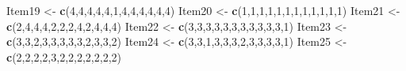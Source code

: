 \documentclass[
  english,
]{book}
\newenvironment{Shaded}{\begin{snugshade}}{\end{snugshade}}
\newcommand{\DecValTok}[1]{\textcolor[rgb]{0.00,0.00,0.81}{#1}}
\newcommand{\KeywordTok}[1]{\textcolor[rgb]{0.13,0.29,0.53}{\textbf{#1}}}
\newcommand{\NormalTok}[1]{#1}
\newcommand{\StringTok}[1]{\textcolor[rgb]{0.31,0.60,0.02}{#1}}
\begin{document}
\begin{Shaded}
\begin{Highlighting}[]
\NormalTok{Item19 <-}\StringTok{ }\KeywordTok{c}\NormalTok{(}\DecValTok{4}\NormalTok{,}\DecValTok{4}\NormalTok{,}\DecValTok{4}\NormalTok{,}\DecValTok{4}\NormalTok{,}\DecValTok{4}\NormalTok{,}\DecValTok{1}\NormalTok{,}\DecValTok{4}\NormalTok{,}\DecValTok{4}\NormalTok{,}\DecValTok{4}\NormalTok{,}\DecValTok{4}\NormalTok{,}\DecValTok{4}\NormalTok{,}\DecValTok{4}\NormalTok{)}
\NormalTok{Item20 <-}\StringTok{ }\KeywordTok{c}\NormalTok{(}\DecValTok{1}\NormalTok{,}\DecValTok{1}\NormalTok{,}\DecValTok{1}\NormalTok{,}\DecValTok{1}\NormalTok{,}\DecValTok{1}\NormalTok{,}\DecValTok{1}\NormalTok{,}\DecValTok{1}\NormalTok{,}\DecValTok{1}\NormalTok{,}\DecValTok{1}\NormalTok{,}\DecValTok{1}\NormalTok{,}\DecValTok{1}\NormalTok{,}\DecValTok{1}\NormalTok{)}
\NormalTok{Item21 <-}\StringTok{ }\KeywordTok{c}\NormalTok{(}\DecValTok{2}\NormalTok{,}\DecValTok{4}\NormalTok{,}\DecValTok{4}\NormalTok{,}\DecValTok{4}\NormalTok{,}\DecValTok{2}\NormalTok{,}\DecValTok{2}\NormalTok{,}\DecValTok{2}\NormalTok{,}\DecValTok{4}\NormalTok{,}\DecValTok{2}\NormalTok{,}\DecValTok{4}\NormalTok{,}\DecValTok{4}\NormalTok{,}\DecValTok{4}\NormalTok{)}
\NormalTok{Item22 <-}\StringTok{ }\KeywordTok{c}\NormalTok{(}\DecValTok{3}\NormalTok{,}\DecValTok{3}\NormalTok{,}\DecValTok{3}\NormalTok{,}\DecValTok{3}\NormalTok{,}\DecValTok{3}\NormalTok{,}\DecValTok{3}\NormalTok{,}\DecValTok{3}\NormalTok{,}\DecValTok{3}\NormalTok{,}\DecValTok{3}\NormalTok{,}\DecValTok{3}\NormalTok{,}\DecValTok{3}\NormalTok{,}\DecValTok{1}\NormalTok{)}
\NormalTok{Item23 <-}\StringTok{ }\KeywordTok{c}\NormalTok{(}\DecValTok{3}\NormalTok{,}\DecValTok{3}\NormalTok{,}\DecValTok{2}\NormalTok{,}\DecValTok{3}\NormalTok{,}\DecValTok{3}\NormalTok{,}\DecValTok{3}\NormalTok{,}\DecValTok{3}\NormalTok{,}\DecValTok{3}\NormalTok{,}\DecValTok{2}\NormalTok{,}\DecValTok{3}\NormalTok{,}\DecValTok{3}\NormalTok{,}\DecValTok{2}\NormalTok{)}
\NormalTok{Item24 <-}\StringTok{ }\KeywordTok{c}\NormalTok{(}\DecValTok{3}\NormalTok{,}\DecValTok{3}\NormalTok{,}\DecValTok{1}\NormalTok{,}\DecValTok{3}\NormalTok{,}\DecValTok{3}\NormalTok{,}\DecValTok{3}\NormalTok{,}\DecValTok{2}\NormalTok{,}\DecValTok{3}\NormalTok{,}\DecValTok{3}\NormalTok{,}\DecValTok{3}\NormalTok{,}\DecValTok{3}\NormalTok{,}\DecValTok{1}\NormalTok{)}
\NormalTok{Item25 <-}\StringTok{ }\KeywordTok{c}\NormalTok{(}\DecValTok{2}\NormalTok{,}\DecValTok{2}\NormalTok{,}\DecValTok{2}\NormalTok{,}\DecValTok{2}\NormalTok{,}\DecValTok{3}\NormalTok{,}\DecValTok{2}\NormalTok{,}\DecValTok{2}\NormalTok{,}\DecValTok{2}\NormalTok{,}\DecValTok{2}\NormalTok{,}\DecValTok{2}\NormalTok{,}\DecValTok{2}\NormalTok{,}\DecValTok{2}\NormalTok{)}

\end{Highlighting}
\end{Shaded}
\end{document}
